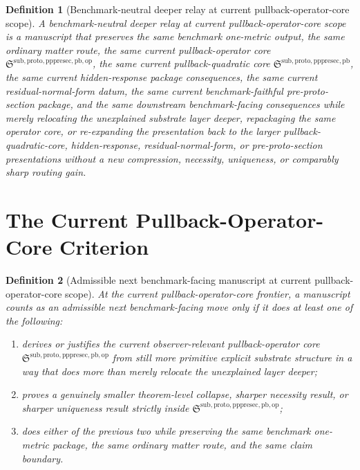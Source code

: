 \documentclass[11pt]{article}
\newcommand{\PrePreProtoSectionPullbackCore}{\mathfrak S^{\mathrm{sub,proto,pppresec,pb}}}
\newcommand{\PullbackOperatorCore}{\mathfrak S^{\mathrm{sub,proto,pppresec,pb,op}}}
\newtheorem{definition}{Definition}
\begin{document}
\begin{definition}[Benchmark-neutral deeper relay at current pullback-operator-core scope]
A \emph{benchmark-neutral deeper relay at current pullback-operator-core scope} is a manuscript that preserves the same benchmark one-metric output, the same ordinary matter route, the same current pullback-operator core \(\PullbackOperatorCore\), the same current pullback-quadratic core \(\PrePreProtoSectionPullbackCore\), the same current hidden-response package consequences, the same current residual-normal-form datum, the same current benchmark-faithful pre-proto-section package, and the same downstream benchmark-facing consequences while merely relocating the unexplained substrate layer deeper, repackaging the same operator core, or re-expanding the presentation back to the larger pullback-quadratic-core, hidden-response, residual-normal-form, or pre-proto-section presentations without a new compression, necessity, uniqueness, or comparably sharp routing gain.
\end{definition}

\section{The Current Pullback-Operator-Core Criterion}

\begin{definition}[Admissible next benchmark-facing manuscript at current pullback-operator-core scope]
At the current pullback-operator-core frontier, a manuscript counts as an admissible next benchmark-facing move only if it does at least one of the following:
\begin{enumerate}
    \item derives or justifies the current observer-relevant pullback-operator core \(\PullbackOperatorCore\) from still more primitive explicit substrate structure in a way that does more than merely relocate the unexplained layer deeper;
    \item proves a genuinely smaller theorem-level collapse, sharper necessity result, or sharper uniqueness result strictly inside \(\PullbackOperatorCore\);
    \item does either of the previous two while preserving the same benchmark one-metric package, the same ordinary matter route, and the same claim boundary.
\end{enumerate}
\end{definition}
\end{document}
